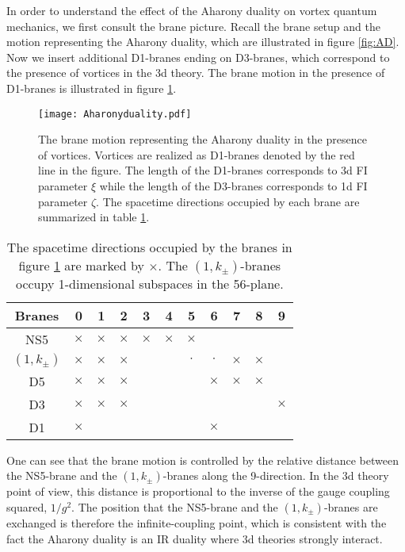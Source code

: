 \documentclass[a4paper,11pt]{article}
\begin{document}
In order to understand the effect of the Aharony duality on vortex quantum mechanics, we first consult the brane picture. Recall the brane setup and the motion representing the Aharony duality, which are illustrated in figure \ref{fig:AD}. Now we insert additional D1-branes ending on D3-branes, which correspond to the presence of vortices in the 3d theory. The brane motion in the presence of D1-branes is illustrated in figure \ref{fig:Aharony duality}.
%
\begin{figure}[tbp]
\centering %
\texttt{[image: Aharonyduality.pdf]}
\caption{\label{fig:Aharony duality} The brane motion representing the Aharony duality in the presence of vortices. Vortices are realized as D1-branes denoted by the red line in the figure. The length of the D1-branes corresponds to 3d FI parameter $\xi$ while the length of the D3-branes corresponds to 1d FI parameter $\zeta$. The spacetime directions occupied by each brane are summarized in table \ref{tab:Aharony branes}.}
\end{figure}
%
%
\begin{table}[tbp]
\centering
\begin{tabular}{|c|cccccccccc|}
\hline
Branes & 0 & 1 & 2 & 3 & 4 & 5 & 6 & 7 & 8 & 9 \\
\hline
NS5 & $\times$ & $\times$ & $\times$ & $\times$ & $\times$ & $\times$ & & & & \\
$(1,k_\pm)$ & $\times$ & $\times$ & $\times$ & & & $\cdot$ & $\cdot$ & $\times$ & $\times$ & \\
D5 & $\times$ & $\times$ & $\times$ & & & & $\times$ & $\times$ & $\times$ & \\
D3 & $\times$ & $\times$ & $\times$ & & & & & & & $\times$ \\
D1 & $\times$ & & & & & & $\times$ & & & \\
\hline
\end{tabular}
\caption{\label{tab:Aharony branes} The spacetime directions occupied by the branes in figure \ref{fig:Aharony duality} are marked by $\times$. The $(1,k_\pm)$-branes occupy 1-dimensional subspaces in the 56-plane.}
\end{table}
%
One can see that the brane motion is controlled by the relative distance between the NS5-brane and the $(1,k_\pm)$-branes along the 9-direction. In the 3d theory point of view, this distance is proportional to the inverse of the gauge coupling squared, $1/g^2$. The position that the NS5-brane and the $(1,k_\pm)$-branes are exchanged is therefore the infinite-coupling point, which is consistent with the fact the Aharony duality is an IR duality where 3d theories strongly interact.
\end{document}
